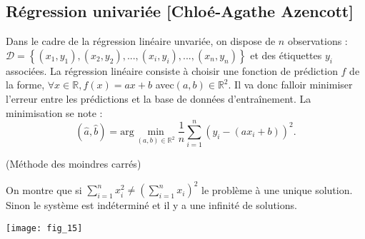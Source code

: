 \subsection{Régression univariée [Chloé-Agathe Azencott]}

\begin{minipage}[c]{.6\linewidth}
Dans le cadre de la régression linéaire unvariée, on dispose de $n$ observations : $\mathcal{D}=\left\{ \left(x_1,y_1 \right), \left(x_2,y_2 \right), ..., \left(x_i,y_i \right), ..., \left(x_n,y_n \right)\right\}$ et des étiquettes $y_i$ associées. 
La régression linéaire consiste à choisir une fonction de prédiction $f$ de la forme, $\forall x \in \mathbb{R}, f(x)=ax+b$ avec$\left(a,b\right) \in \mathbb{R}^2$. Il va donc falloir minimiser l'erreur entre les prédictions et la base de données d’entraînement. La minimisation se note : 
$$ \left(\hat{a},\hat{b}\right)= \text{arg} \min\limits_{\left(a,b\right) \in \mathbb{R}^2} \dfrac{1}{n}\sum\limits_{i=1}^{n}\left( y_i - \left(ax_i +b\right) \right)^2.$$

(Méthode des moindres carrés)

On montre que si $\sum\limits_{i=1}^{n}x_i^2 \neq \left(\sum\limits_{i=1}^{n}x_i\right)^2 $ le problème à une unique solution. Sinon le système est indéterminé et il y a une infinité de solutions.
\end{minipage} \hfill
\begin{minipage}[c]{.35\linewidth}
\begin{center}
\texttt{[image: fig\_15]}
\end{center}
\end{minipage} 



